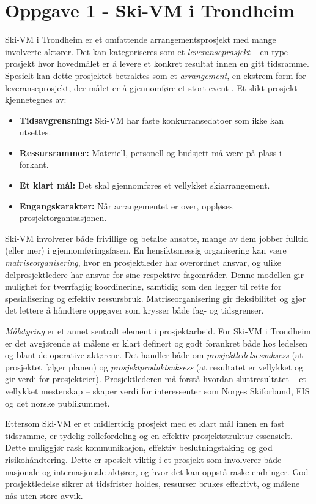 \section{Oppgave 1 - Ski-VM i Trondheim}

Ski-VM i Trondheim er et omfattende arrangementsprosjekt med mange involverte aktører. Det kan kategoriseres som et \emph{leveranseprosjekt} – en type prosjekt hvor hovedmålet er å levere et konkret resultat innen en gitt tidsramme. Spesielt kan dette prosjektet betraktes som et \emph{arrangement}, en ekstrem form for leveranseprosjekt, der målet er å gjennomføre et stort event \cite{torvatn2024}. Et slikt prosjekt kjennetegnes av:
\begin{itemize}
    \item \textbf{Tidsavgrensning:} Ski-VM har faste konkurransedatoer som ikke kan utsettes.
    \item \textbf{Ressursrammer:} Materiell, personell og budsjett må være på plass i forkant.
    \item \textbf{Et klart mål:} Det skal gjennomføres et vellykket skiarrangement.
    \item \textbf{Engangskarakter:} Når arrangementet er over, oppløses prosjektorganisasjonen.
\end{itemize}

Ski-VM involverer både frivillige og betalte ansatte, mange av dem jobber fulltid (eller mer) i gjennomføringsfasen. En hensiktsmessig organisering kan være \emph{matriseorganisering}, hvor en prosjektleder har overordnet ansvar, og ulike delprosjektledere har ansvar for sine respektive fagområder. Denne modellen gir mulighet for tverrfaglig koordinering, samtidig som den legger til rette for spesialisering og effektiv ressursbruk. Matriseorganisering gir fleksibilitet og gjør det lettere å håndtere oppgaver som krysser både fag- og tidsgrenser.

\emph{Målstyring} er et annet sentralt element i prosjektarbeid. For Ski-VM i Trondheim er det avgjørende at målene er klart definert og godt forankret både hos ledelsen og blant de operative aktørene. Det handler både om \emph{prosjektledelsessuksess} (at prosjektet følger planen) og \emph{prosjektproduktsuksess} (at resultatet er vellykket og gir verdi for prosjekteier). Prosjektlederen må forstå hvordan sluttresultatet – et vellykket mesterskap – skaper verdi for interessenter som Norges Skiforbund, FIS og det norske publikummet.

Ettersom Ski-VM er et midlertidig prosjekt med et klart mål innen en fast tidsramme, er tydelig rollefordeling og en effektiv prosjektstruktur essensielt. Dette muliggjør rask kommunikasjon, effektiv beslutningstaking og god risikohåndtering. Dette er spesielt viktig i et prosjekt som involverer både nasjonale og internasjonale aktører, og hvor det kan oppstå raske endringer. God prosjektledelse sikrer at tidsfrister holdes, ressurser brukes effektivt, og målene nås uten store avvik.

